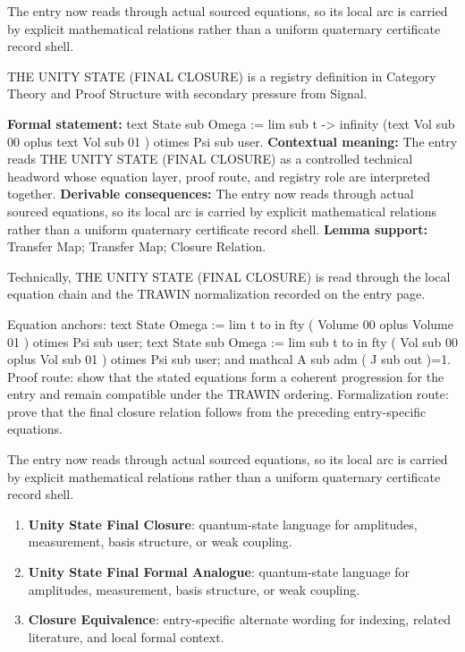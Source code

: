 The entry now reads through actual sourced equations, so its local arc is carried by explicit mathematical relations rather than a uniform quaternary certificate record shell.
\clearpage


\begingroup\small
{}
THE UNITY STATE (FINAL CLOSURE) is a registry definition in Category Theory and Proof Structure with secondary pressure from Signal.

\begingroup\footnotesize\setlength{\emergencystretch}{3em}\sloppy
\textbf{Formal statement:} text State sub Omega := lim sub t -> infinity (text Vol sub 00 oplus text Vol sub 01 ) otimes Psi sub user. \textbf{Contextual meaning:} The entry reads THE UNITY STATE (FINAL CLOSURE) as a controlled technical headword whose equation layer, proof route, and registry role are interpreted together. \textbf{Derivable consequences:} The entry now reads through actual sourced equations, so its local arc is carried by explicit mathematical relations rather than a uniform quaternary certificate record shell. \textbf{Lemma support:} Transfer Map; Transfer Map; Closure Relation.\par
\endgroup

Technically, THE UNITY STATE (FINAL CLOSURE) is read through the local equation chain and the TRAWIN normalization recorded on the entry page.

Equation anchors: text State Omega := lim t to in fty ( Volume 00 oplus Volume 01 ) otimes Psi sub user; text State sub Omega := lim sub t to in fty ( Vol sub 00 oplus Vol sub 01 ) otimes Psi sub user; and mathcal A sub adm ( J sub out )=1. Proof route: show that the stated equations form a coherent progression for the entry and remain compatible under the TRAWIN ordering. Formalization route: prove that the final closure relation follows from the preceding entry-specific equations.

The entry now reads through actual sourced equations, so its local arc is carried by explicit mathematical relations rather than a uniform quaternary certificate record shell.
\endgroup

\begin{enumerate}[leftmargin=1.6em,itemsep=6pt,topsep=4pt]
\item \textbf{Unity State Final Closure}: quantum-state language for amplitudes, measurement, basis structure, or weak coupling.
\item \textbf{Unity State Final Formal Analogue}: quantum-state language for amplitudes, measurement, basis structure, or weak coupling.
\item \textbf{Closure Equivalence}: entry-specific alternate wording for indexing, related literature, and local formal context.
\end{enumerate}


